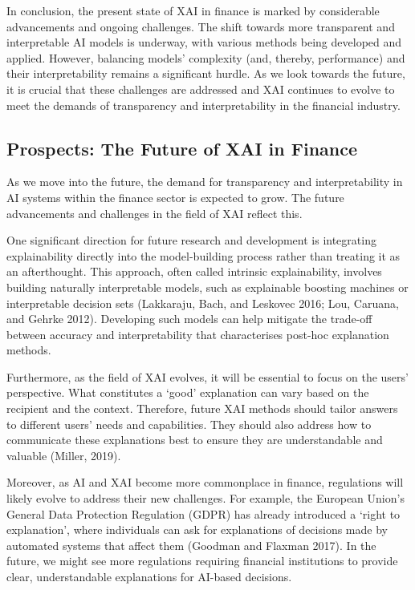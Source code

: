 \documentclass[
  letterpaper,
  DIV=11,
  numbers=noendperiod]{scrartcl}
\begin{document}
In conclusion, the present state of XAI in finance is marked by
considerable advancements and ongoing challenges. The shift towards more
transparent and interpretable AI models is underway, with various
methods being developed and applied. However, balancing models'
complexity (and, thereby, performance) and their interpretability
remains a significant hurdle. As we look towards the future, it is
crucial that these challenges are addressed and XAI continues to evolve
to meet the demands of transparency and interpretability in the
financial industry.

\hypertarget{prospects-the-future-of-xai-in-finance}{%
\subsection{Prospects: The Future of XAI in
Finance}\label{prospects-the-future-of-xai-in-finance}}

As we move into the future, the demand for transparency and
interpretability in AI systems within the finance sector is expected to
grow. The future advancements and challenges in the field of XAI reflect
this.

One significant direction for future research and development is
integrating explainability directly into the model-building process
rather than treating it as an afterthought. This approach, often called
intrinsic explainability, involves building naturally interpretable
models, such as explainable boosting machines or interpretable decision
sets (Lakkaraju, Bach, and Leskovec 2016; Lou, Caruana, and Gehrke
2012). Developing such models can help mitigate the trade-off between
accuracy and interpretability that characterises post-hoc explanation
methods.

Furthermore, as the field of XAI evolves, it will be essential to focus
on the users' perspective. What constitutes a `good' explanation can
vary based on the recipient and the context. Therefore, future XAI
methods should tailor answers to different users' needs and
capabilities. They should also address how to communicate these
explanations best to ensure they are understandable and valuable
(Miller, 2019).

Moreover, as AI and XAI become more commonplace in finance, regulations
will likely evolve to address their new challenges. For example, the
European Union's General Data Protection Regulation (GDPR) has already
introduced a `right to explanation', where individuals can ask for
explanations of decisions made by automated systems that affect them
(Goodman and Flaxman 2017). In the future, we might see more regulations
requiring financial institutions to provide clear, understandable
explanations for AI-based decisions.
\end{document}

